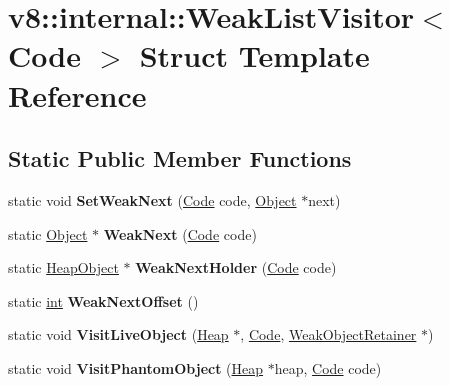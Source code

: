 \hypertarget{structv8_1_1internal_1_1WeakListVisitor_3_01Code_01_4}{}\section{v8\+:\+:internal\+:\+:Weak\+List\+Visitor$<$ Code $>$ Struct Template Reference}
\label{structv8_1_1internal_1_1WeakListVisitor_3_01Code_01_4}
\subsection*{Static Public Member Functions}
\begin{DoxyCompactItemize}
\item 
\mbox{\label{structv8_1_1internal_1_1WeakListVisitor_3_01Code_01_4_a850a1dcdaa835f881102adfb3ac47e73}} 
static void {\bfseries Set\+Weak\+Next} (\mbox{\hyperlink{classv8_1_1internal_1_1Code}{Code}} code, \mbox{\hyperlink{classv8_1_1internal_1_1Object}{Object}} $\ast$next)
\item 
\mbox{\label{structv8_1_1internal_1_1WeakListVisitor_3_01Code_01_4_ab7e14ad8ad87f4b5751038ce34444d38}} 
static \mbox{\hyperlink{classv8_1_1internal_1_1Object}{Object}} $\ast$ {\bfseries Weak\+Next} (\mbox{\hyperlink{classv8_1_1internal_1_1Code}{Code}} code)
\item 
\mbox{\label{structv8_1_1internal_1_1WeakListVisitor_3_01Code_01_4_a28d9793feb65a594af85676f0ee34f86}} 
static \mbox{\hyperlink{classv8_1_1internal_1_1HeapObject}{Heap\+Object}} $\ast$ {\bfseries Weak\+Next\+Holder} (\mbox{\hyperlink{classv8_1_1internal_1_1Code}{Code}} code)
\item 
\mbox{\label{structv8_1_1internal_1_1WeakListVisitor_3_01Code_01_4_a9da8020888576e0922bd38c4daabbddc}} 
static \mbox{\hyperlink{classint}{int}} {\bfseries Weak\+Next\+Offset} ()
\item 
\mbox{\label{structv8_1_1internal_1_1WeakListVisitor_3_01Code_01_4_a538cd4fd83294162d2ff87db552be419}} 
static void {\bfseries Visit\+Live\+Object} (\mbox{\hyperlink{classv8_1_1internal_1_1Heap}{Heap}} $\ast$, \mbox{\hyperlink{classv8_1_1internal_1_1Code}{Code}}, \mbox{\hyperlink{classv8_1_1internal_1_1WeakObjectRetainer}{Weak\+Object\+Retainer}} $\ast$)
\item 
\mbox{\label{structv8_1_1internal_1_1WeakListVisitor_3_01Code_01_4_a8f783df4edd8f7c3bfed3a36ff81b2d1}} 
static void {\bfseries Visit\+Phantom\+Object} (\mbox{\hyperlink{classv8_1_1internal_1_1Heap}{Heap}} $\ast$heap, \mbox{\hyperlink{classv8_1_1internal_1_1Code}{Code}} code)
\end{DoxyCompactItemize}


